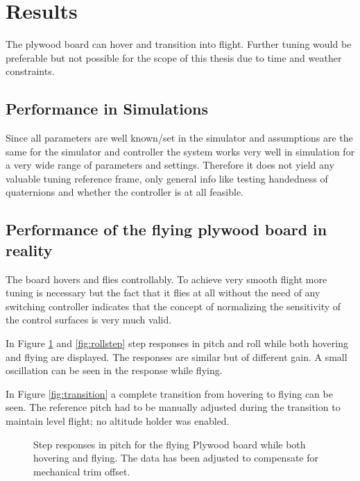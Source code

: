 \documentclass{article}
\begin{document}
\section{Results}

The plywood board can hover and transition into flight.
Further tuning would be preferable but not possible for the scope of this thesis due to time and weather constraints.

\subsection{Performance in Simulations}
Since all parameters are well known/set in the simulator and assumptions are the same for the simulator and controller the system works very well in simulation for a very wide range of parameters and settings.
Therefore it does not yield any valuable tuning reference frame, only general info like testing handedness of quaternions and whether the controller is at all feasible.



\subsection{Performance of the flying plywood board in reality}
The board hovers and flies controllably.
To achieve very smooth flight more tuning is necessary but the fact that it flies at all without the need of any switching controller indicates that the concept of normalizing the sensitivity of the control surfaces is very much valid.

In Figure \ref{fig:pitchstep} and \ref{fig:rollstep} step responses in pitch and roll while both hovering and flying are displayed.
The responses are similar but of different gain.
A small oscillation can be seen in the response while flying.

In Figure \ref{fig:transition} a complete transition from hovering to flying can be seen.
The reference pitch had to be manually adjusted during the transition to maintain level flight; no altitude holder was enabled.


\begin{figure}[]
    \centering
    
    \caption{Step responses in pitch for the flying Plywood board while both hovering and flying. The data has been adjusted to compensate for mechanical trim offset.}
    \label{fig:pitchstep}
\end{figure}
\end{document}
